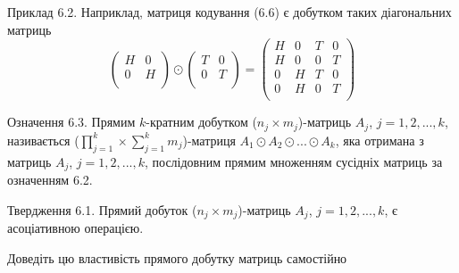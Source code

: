 \begin{example}
    Приклад 6.2. Наприклад, матриця кодування (6.6) є добутком таких діагональних
    матриць
    \begin{equation*}
        \begin{pmatrix}
            H & 0 \\
            0 & H \\
        \end{pmatrix}
        \odot \begin{pmatrix}
            T & 0 \\
            0 & T \\
        \end{pmatrix}
        = \begin{pmatrix}
            H & 0 & T & 0 \\
            H & 0 & 0 & T \\
            0 & H & T & 0 \\
            0 & H & 0 & T \\
        \end{pmatrix}
    \end{equation*}
\end{example}

\begin{definition}
    Означення 6.3. Прямим $k$-кратним добутком ($n_j \times m_j$)-матриць $A_j$, $j = 1, 2, ...,k$,
    називається ($\prod_{j = 1}^k \times \sum_{j = 1}^k m_j$)-матриця $A_1 \odot A_2 \odot ... \odot A_k$, яка отримана з
    матриць $A_j$, $j = 1, 2, ..., k$, послідовним прямим множенням сусідніх матриць за означенням 6.2.
\end{definition}

\begin{claim}
    Твердження 6.1. Прямий добуток ($n_j \times m_j$)-матриць $A_j$, $j = 1, 2, ..., k$, є
    асоціативною операцією.
\end{claim}

Доведіть цю властивість прямого добутку матриць самостійно

